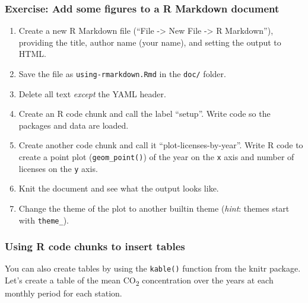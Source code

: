 \documentclass[]{Nemilov}
\newenvironment{Shaded}{\begin{snugshade}}{\end{snugshade}}
\newcommand{\BaseNTok}[1]{\textcolor[rgb]{0.00,0.00,0.81}{#1}}
\newcommand{\NormalTok}[1]{#1}
\providecommand{\tightlist}{%
  \setlength{\itemsep}{0pt}\setlength{\parskip}{0pt}}
\begin{document}
\hypertarget{exercise-add-some-figures-to-a-r-markdown-document}{%
\subsubsection{Exercise: Add some figures to a R Markdown document}\label{exercise-add-some-figures-to-a-r-markdown-document}}

\begin{enumerate}
\def\labelenumi{\arabic{enumi}.}
\tightlist
\item
  Create a new R Markdown file (``File -\textgreater{} New File -\textgreater{} R Markdown''), providing
  the title, author name (your name), and setting the output to HTML.
\item
  Save the file as \texttt{using-rmarkdown.Rmd} in the \texttt{doc/} folder.
\item
  Delete all text \emph{except} the YAML header.
\item
  Create an R code chunk and call the label ``setup''. Write code so the packages
  and data are loaded.
\item
  Create another code chunk and call it ``plot-licenses-by-year''. Write R code
  to create a point plot (\texttt{geom\_point()}) of the year on the \texttt{x} axis and number
  of licenses on the \texttt{y} axis.
\item
  Knit the document and see what the output looks like.
\item
  Change the theme of the plot to another builtin theme (\emph{hint}: themes start
  with \texttt{theme\_}).
\end{enumerate}

\hypertarget{using-r-code-chunks-to-insert-tables}{%
\subsubsection{Using R code chunks to insert tables}\label{using-r-code-chunks-to-insert-tables}}

You can also create tables by using the \texttt{kable()} function from the knitr package.
Let's create a table of the mean CO\textsubscript{2} concentration over the years at each
monthly period for each station.

\begin{Shaded}
\end{Shaded}
\end{document}
